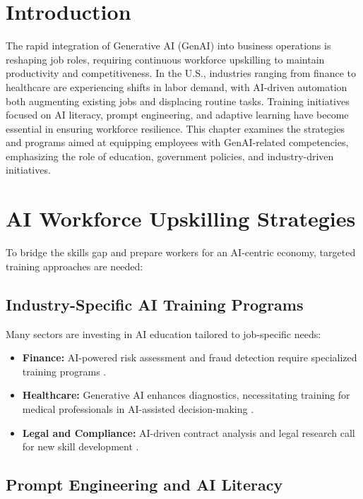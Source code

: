 \documentclass[a4paper,headinclude=on,footinclude=on,12pt,oneside]{scrbook}
\begin{document}
\section{Introduction}

The rapid integration of Generative AI (GenAI) into business operations is reshaping job roles, requiring continuous workforce upskilling to maintain productivity and competitiveness. In the U.S., industries ranging from finance to healthcare are experiencing shifts in labor demand, with AI-driven automation both augmenting existing jobs and displacing routine tasks. Training initiatives focused on AI literacy, prompt engineering, and adaptive learning have become essential in ensuring workforce resilience. This chapter examines the strategies and programs aimed at equipping employees with GenAI-related competencies, emphasizing the role of education, government policies, and industry-driven initiatives.

\section{AI Workforce Upskilling Strategies}

To bridge the skills gap and prepare workers for an AI-centric economy, targeted training approaches are needed:

\subsection{Industry-Specific AI Training Programs}

Many sectors are investing in AI education tailored to job-specific needs:
\begin{itemize}
	\item \textbf{Finance:} AI-powered risk assessment and fraud detection require specialized training programs \cite{diegoAIHandsonLLMs2024}.
	\item \textbf{Healthcare:} Generative AI enhances diagnostics, necessitating training for medical professionals in AI-assisted decision-making \cite{GenerativeArtificialIntelligence}.
	\item \textbf{Legal and Compliance:} AI-driven contract analysis and legal research call for new skill development \cite{StudentPGRGuidance}.
\end{itemize}

\subsection{Prompt Engineering and AI Literacy}
\end{document}
